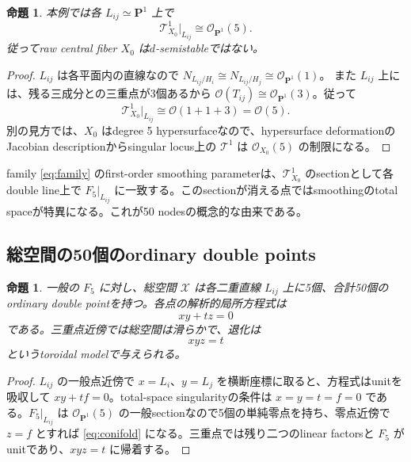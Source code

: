 \documentclass[11pt,a4paper]{ltjsarticle}
\newtheorem{proposition}[theorem]{命題}
\theoremstyle{definition}
\theoremstyle{remark}
\newcommand{\PP}{\mathbf P}
\begin{document}
\begin{proposition}\label{prop:T1O5}
本例では各 $L_{ij}\simeq\PP^1$ 上で
\begin{equation}\label{eq:T1O5}
 \mathcal T^1_{X_0}|_{L_{ij}}\cong\mathcal O_{\PP^1}(5).
\end{equation}
従ってraw central fiber $X_0$ は$d$-semistableではない。
\end{proposition}

\begin{proof}
$L_{ij}$ は各平面内の直線なので
$N_{L_{ij}/H_i}\cong N_{L_{ij}/H_j}\cong\mathcal O_{\PP^1}(1)$。
また $L_{ij}$ 上には、残る三成分との三重点が3個あるから
$\mathcal O(T_{ij})\cong\mathcal O_{\PP^1}(3)$。従って
\[
 \mathcal T^1_{X_0}|_{L_{ij}}
 \cong\mathcal O(1+1+3)=\mathcal O(5).
\]
別の見方では、$X_0$ はdegree 5 hypersurfaceなので、hypersurface deformationのJacobian descriptionからsingular locus上の $\mathcal T^1$ は $\mathcal O_{X_0}(5)$ の制限になる。
\end{proof}

family \eqref{eq:family} のfirst-order smoothing parameterは、$\mathcal T^1_{X_0}$ のsectionとして各double line上で $F_5|_{L_{ij}}$ に一致する。このsectionが消える点ではsmoothingのtotal spaceが特異になる。これが50 nodesの概念的な由来である。

\subsection{総空間の50個のordinary double points}

\begin{proposition}\label{prop:50nodes}
一般の $F_5$ に対し、総空間 $\mathcal X$ は各二重直線 $L_{ij}$ 上に5個、合計50個のordinary double pointを持つ。各点の解析的局所方程式は
\begin{equation}\label{eq:conifold}
 xy+tz=0
\end{equation}
である。三重点近傍では総空間は滑らかで、退化は
\begin{equation}\label{eq:triplelocal}
 xyz=t
\end{equation}
というtoroidal modelで与えられる。
\end{proposition}

\begin{proof}
$L_{ij}$ の一般点近傍で $x=L_i$、$y=L_j$ を横断座標に取ると、方程式はunitを吸収して $xy+tf=0$。total-space singularityの条件は $x=y=t=f=0$ である。$F_5|_{L_{ij}}$ は $\mathcal O_{\PP^1}(5)$ の一般sectionなので5個の単純零点を持ち、零点近傍で $z=f$ とすれば \eqref{eq:conifold} になる。三重点では残り二つのlinear factorsと $F_5$ がunitであり、$xyz=t$ に帰着する。
\end{proof}
\end{document}
